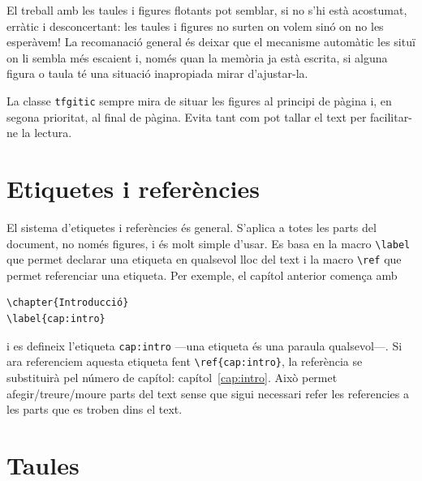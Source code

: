 \documentclass{tfgitic}
\begin{document}
El treball amb les taules i figures flotants pot semblar, si no s'hi
està acostumat, erràtic i desconcertant: les taules i figures no
surten on volem sinó on no les esperàvem! La recomanació general és
deixar que el mecanisme automàtic les situï on li sembla més escaient
i, només quan la memòria ja està escrita, si alguna figura o taula té
una situació inapropiada mirar d'ajustar-la.

La classe \texttt{tfgitic} sempre mira de situar les figures al
principi de pàgina i, en segona prioritat, al final de pàgina. Evita
tant com pot tallar el text per facilitar-ne la lectura.


\section{Etiquetes i referències}
\label{apa:etiquetes}

El sistema d'etiquetes i referències és general. S'aplica a totes les
parts del document, no només figures, i és molt simple d'usar. Es basa
en la macro \verb!\label! que permet declarar una etiqueta en
qualsevol lloc del text i la macro \verb!\ref! que permet referenciar
una etiqueta. Per exemple, el capítol anterior comença amb
\begin{verbatim}
\chapter{Introducció}
\label{cap:intro}
\end{verbatim}
i es defineix l'etiqueta \verb!cap:intro! ---una etiqueta és una
paraula qualsevol---. Si ara referenciem aquesta etiqueta fent
\verb!\ref{cap:intro}!, la referència se substituirà pel número de
capítol: capítol~\ref{cap:intro}. Això permet afegir/treure/moure
parts del text sense que sigui necessari refer les referencies a les
parts que es troben dins el text.


\section{Taules}
\label{sec:taules}
\end{document}
